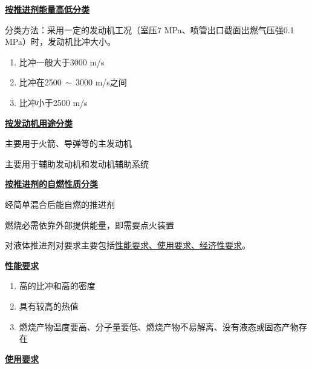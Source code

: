 \noindent \textbf{\underline{按推进剂能量高低分类}}

\noindent 分类方法：采用一定的发动机工况（室压7 MPa、喷管出口截面出燃气压强0.1 MPa）时，发动机比冲大小。\vspace*{-0.5em}
\begin{enumerate}[\hspace*{1.5em} (1)  ]
	\item {} \quad 比冲一般大于3000 m/s \vspace*{-0.5em}
	\item {} \quad 比冲在2500$\, \sim \,$3000 m/s之间 \vspace*{-0.5em}
	\item {} \quad 比冲小于2500 m/s
\end{enumerate}

\noindent \textbf{\underline{按发动机用途分类}}

主要用于火箭、导弹等的主发动机

主要用于辅助发动机和发动机辅助系统

\vspace*{0.5em}

\noindent \textbf{\underline{按推进剂的自燃性质分类}}

\quad 经简单混合后能自燃的推进剂

 \quad 燃烧必需依靠外部提供能量，即需要点火装置


\sssection[发动机对液体推进剂对要求]

对液体推进剂对要求主要包括\underline{性能要求、使用要求、经济性要求}。
\vspace*{0.5em}

\noindent \textbf{\underline{性能要求}}\vspace*{-0.5em}
\begin{enumerate}[\hspace*{1.5em} (1) ]
	\item 高的比冲和高的密度\vspace*{-0.5em}
	\item 具有较高的热值\vspace*{-0.5em}
	\item 燃烧产物温度要高、分子量要低、燃烧产物不易解离、没有液态或固态产物存在
\end{enumerate}

\noindent \textbf{\underline{使用要求}}

